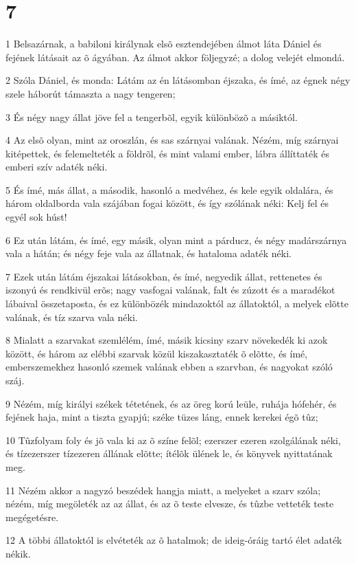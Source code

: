\chapter{7}

\par 1 Belsazárnak, a babiloni királynak elsõ esztendejében álmot láta Dániel és fejének látásait az õ ágyában. Az álmot akkor följegyzé; a dolog velejét elmondá.
\par 2 Szóla Dániel, és monda: Látám az én látásomban éjszaka, és ímé, az égnek négy szele háborút támaszta a nagy tengeren;
\par 3 És négy nagy állat jöve fel a tengerbõl, egyik különbözõ a másiktól.
\par 4 Az elsõ olyan, mint az oroszlán, és sas szárnyai valának. Nézém, míg szárnyai kitépettek, és felemelteték a földrõl, és mint valami ember, lábra állíttaték és emberi szív adaték néki.
\par 5 És ímé, más állat, a második, hasonló a medvéhez, és kele egyik oldalára, és három oldalborda vala szájában fogai között, és így szólának néki: Kelj fel és egyél sok húst!
\par 6 Ez után látám, és ímé, egy másik, olyan mint a párducz, és négy madárszárnya vala a hátán; és négy feje vala az állatnak, és hataloma adaték néki.
\par 7 Ezek után látám éjszakai látásokban, és ímé, negyedik állat, rettenetes és iszonyú és rendkivül erõs; nagy vasfogai valának, falt és zúzott és a maradékot lábaival összetaposta, és ez különbözék mindazoktól az állatoktól, a melyek elõtte valának, és tíz szarva vala néki.
\par 8 Mialatt a szarvakat szemlélém, ímé, másik kicsiny szarv növekedék ki azok között, és három az elébbi szarvak közül kiszakasztaték õ elõtte, és ímé, emberszemekhez hasonló szemek valának ebben a szarvban, és nagyokat szóló száj.
\par 9 Nézém, míg királyi székek tétetének, és az öreg korú leüle, ruhája hófehér, és fejének haja, mint a tiszta gyapjú; széke tüzes láng, ennek kerekei égõ tûz;
\par 10 Tûzfolyam foly és jõ vala ki az õ színe felõl; ezerszer ezeren szolgálának néki, és tízezerszer tízezeren állának elõtte; ítélõk ülének le, és könyvek  nyittatának meg.
\par 11 Nézém akkor a nagyzó beszédek hangja miatt, a melyeket a szarv szóla; nézém, míg megöleték az az állat, és az õ teste elvesze, és tûzbe vetteték teste megégetésre.
\par 12 A többi állatoktól is elvéteték az õ hatalmok; de ideig-óráig tartó élet adaték nékik.
